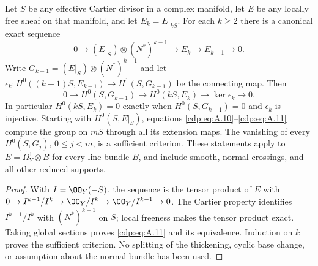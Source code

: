
\begin{proposition}\label{cdp:st:A.3.1}
Let $S$ be any effective Cartier divisor in a complex manifold, let $E$ be any locally free sheaf on that manifold, and let $E_k=E|_{kS}$. For each $k\ge2$ there is a canonical exact sequence
\[
0\longrightarrow (E|_S)\otimes(N^*)^{k-1}
 \longrightarrow E_k\longrightarrow E_{k-1}\longrightarrow0.
\tag{A.10}\label{cdp:eq:A.10}
\]
Write $G_{k-1}=(E|_S)\otimes(N^*)^{k-1}$ and let
$\epsilon_k:H^0((k-1)S,E_{k-1})\to H^1(S,G_{k-1})$
be the connecting map. Then
\[
0\longrightarrow H^0(S,G_{k-1})\longrightarrow H^0(kS,E_k)
 \longrightarrow\ker\epsilon_k\longrightarrow0.
\tag{A.11}\label{cdp:eq:A.11}
\]
In particular $H^0(kS,E_k)=0$ exactly when $H^0(S,G_{k-1})=0$ and $\epsilon_k$ is injective. Starting with $H^0(S,E|_S)$, equations \eqref{cdp:eq:A.10}--\eqref{cdp:eq:A.11} compute the group on $mS$ through all its extension maps. The vanishing of every $H^0(S,G_j)$, $0\le j<m$, is a sufficient criterion. These statements apply to $E=\Omega_Y^1\otimes B$ for every line bundle $B$, and include smooth, normal-crossings, and all other reduced supports.
\end{proposition}
\begin{proof}
With $I=\OO_Y(-S)$, the sequence is the tensor product of $E$ with
$0\to I^{k-1}/I^k\to\OO_Y/I^k\to\OO_Y/I^{k-1}\to0$.
The Cartier property identifies $I^{k-1}/I^k$ with $(N^*)^{k-1}$ on $S$; local freeness makes the tensor product exact. Taking global sections proves \eqref{cdp:eq:A.11} and its equivalence. Induction on $k$ proves the sufficient criterion. No splitting of the thickening, cyclic base change, or assumption about the normal bundle has been used.
\end{proof}


